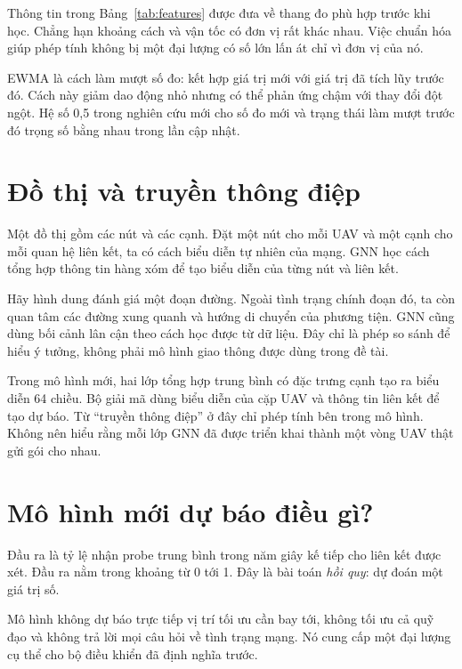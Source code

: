 Thông tin trong Bảng~\ref{tab:features} được đưa về thang đo phù hợp trước khi học. Chẳng hạn khoảng cách và vận tốc có đơn vị rất khác nhau. Việc chuẩn hóa giúp phép tính không bị một đại lượng có số lớn lấn át chỉ vì đơn vị của nó.

EWMA là cách làm mượt số đo: kết hợp giá trị mới với giá trị đã tích lũy trước đó. Cách này giảm dao động nhỏ nhưng có thể phản ứng chậm với thay đổi đột ngột. Hệ số 0,5 trong nghiên cứu mới cho số đo mới và trạng thái làm mượt trước đó trọng số bằng nhau trong lần cập nhật.

\section{Đồ thị và truyền thông điệp}
Một đồ thị gồm các nút và các cạnh. Đặt một nút cho mỗi UAV và một cạnh cho mỗi quan hệ liên kết, ta có cách biểu diễn tự nhiên của mạng. GNN học cách tổng hợp thông tin hàng xóm để tạo biểu diễn của từng nút và liên kết.

Hãy hình dung đánh giá một đoạn đường. Ngoài tình trạng chính đoạn đó, ta còn quan tâm các đường xung quanh và hướng di chuyển của phương tiện. GNN cũng dùng bối cảnh lân cận theo cách học được từ dữ liệu. Đây chỉ là phép so sánh để hiểu ý tưởng, không phải mô hình giao thông được dùng trong đề tài.

Trong mô hình mới, hai lớp tổng hợp trung bình có đặc trưng cạnh tạo ra biểu diễn 64 chiều. Bộ giải mã dùng biểu diễn của cặp UAV và thông tin liên kết để tạo dự báo. Từ ``truyền thông điệp'' ở đây chỉ phép tính bên trong mô hình. Không nên hiểu rằng mỗi lớp GNN đã được triển khai thành một vòng UAV thật gửi gói cho nhau.

\section{Mô hình mới dự báo điều gì?}
Đầu ra là tỷ lệ nhận probe trung bình trong năm giây kế tiếp cho liên kết được xét. Đầu ra nằm trong khoảng từ 0 tới 1. Đây là bài toán \emph{hồi quy}: dự đoán một giá trị số.


Mô hình không dự báo trực tiếp vị trí tối ưu cần bay tới, không tối ưu cả quỹ đạo và không trả lời mọi câu hỏi về tình trạng mạng. Nó cung cấp một đại lượng cụ thể cho bộ điều khiển đã định nghĩa trước.

